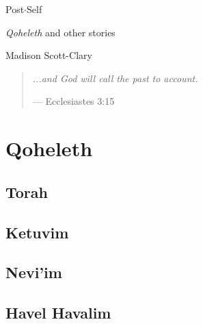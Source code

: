 \documentclass[11pt]{memoir}
\begin{document}
  \frontmatter

  

  \pagestyle{plain}

  \doublespacing

  \begin{flushright}
    \null
    \vfill
    {\Huge\DisplayFont Post$\cdot$Self}

    {\Large\DisplayFont \emph{Qoheleth} and other stories}

    \vfill

    {\Large\DisplayFont Madison Scott-Clary}
  \end{flushright}
  \thispagestyle{empty}

  \newpage

  

  \tableofcontents*
  \newpage
  \null
  \cleardoublepage

  \onehalfspacing

  \null
  \vfill
  \begin{quote}
    \emph{...and God will call the past to account.}

    --- Ecclesiastes 3:15
  \end{quote}
  \vfill

  \mainmatter

  \pagestyle{ourbook}

  \cleardoublepage
  \part*{Qoheleth}
  \chapter{Torah}
  

  \chapter{Ketuvim}
  

  \chapter{Nevi'im}
  

  \chapter{Havel Havalim}
  
\end{document}
